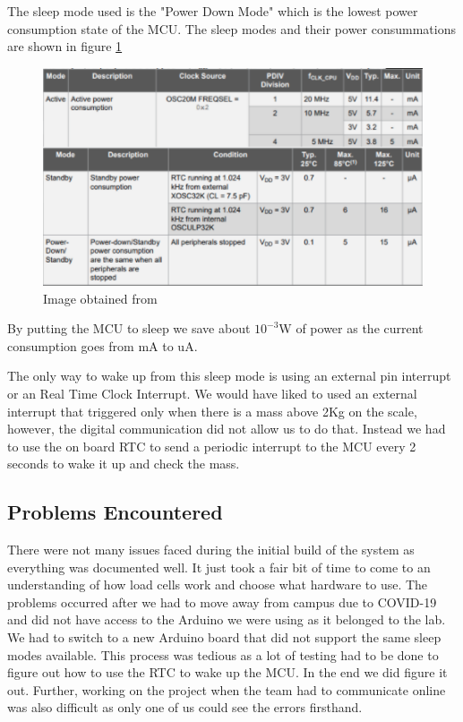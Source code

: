 \documentclass[letterpaper,11pt]{article}
\newcommand{\myLink}[2]{\href{#1}{\color{blue}\underline{\smash{\texttt{#2}}}}}
\begin{document}
The sleep mode used is the "Power Down Mode" which is the lowest power
consumption state of the MCU. The sleep modes and their power consummations are
shown in figure \ref{img:sleep}

\begin{figure}[h]
  \centering
  \includegraphics[width=1.0\textwidth]{powermodes}
  \caption{Image obtained from \myLink{http://ww1.microchip.com/downloads/en/DeviceDoc/ATmega4808-4809-Data-Sheet-DS40002173A.pdf}{ATMEGA 4809 Datasheet}}
  \label{img:sleep}
\end{figure}

By putting the MCU to sleep we save about $10^{-3}$W of power as the current
consumption goes from mA to uA.

The only way to wake up from this sleep mode is using an external pin interrupt
or an Real Time Clock Interrupt. We would have liked to used an external
interrupt that triggered only when there is a mass above 2Kg on the scale,
however, the digital communication did not allow us to do that. Instead we had
to use the on board RTC to send a periodic interrupt to the MCU every 2 seconds
to wake it up and check the mass.

\subsection{Problems Encountered}

There were not many issues faced during the initial build of the system as
everything was documented well. It just took a fair bit of time to come to an
understanding of how load cells work and choose what hardware to use. The
problems occurred after we had to move away from campus due to COVID-19 and did
not have access to the Arduino we were using as it belonged to the lab. We had
to switch to a new Arduino board that did not support the same sleep modes
available. This process was tedious as a lot of testing had to be done to figure
out how to use the RTC to wake up the MCU. In the end we did figure it
out. Further, working on the project when the team had to communicate online was
also difficult as only one of us could see the errors firsthand.
\end{document}
